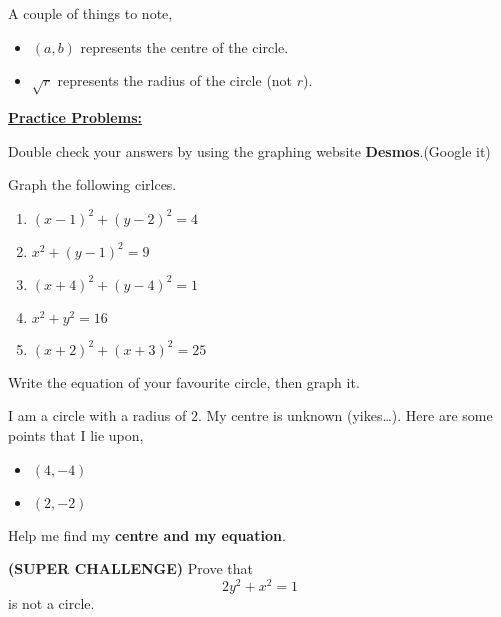 \documentclass[12pt]{article} %
\begin{document}
A couple of things to note,
\begin{itemize}
	\item $(a,b)$ represents the centre of the circle.
	\item $\sqrt{r} $ represents the radius of the circle (not $r$).
\end{itemize}

\textbf{\underline{\Large{Practice Problems:}}}

Double check your answers by using the graphing website \textbf{Desmos}.(Google it)

\begin{qstn}
	Graph the following cirlces.
	\begin{enumerate}[label=(\alph*)]
		\item $(x - 1)^2 + (y-2)^2 = 4$
		\item $x^2 + (y-1)^2 = 9$
		\item $(x+4)^2 + (y - 4)^2 = 1$
		\item $x^2 + y^2 = 16$
		\item $(x+2)^2 + (x+3)^2 = 25$
	\end{enumerate}
\end{qstn}

\begin{qstn}
	Write the equation of your favourite circle, then graph it.
\end{qstn}

\begin{qstn}
	I am a circle with a radius of $2$. My centre is unknown (yikes\ldots). Here are some points that I lie upon,
	\begin{itemize}
		\item $(4,-4)$
		\item $(2,-2)$
	\end{itemize}
	Help me find my \textbf{centre and my equation}.
\end{qstn}



\begin{qstn}
	\textbf{(SUPER CHALLENGE)} Prove that 
				\[
					2y^2 + x^2 = 1
				\] is not a circle.
\end{qstn}
\end{document}
